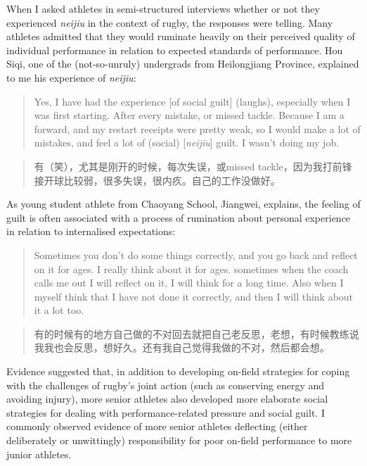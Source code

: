 \begin{CJK}{UTF8}{gbsn}
When I asked athletes in semi-structured interviews whether or not they experienced \textit{neijiu} in the context of rugby, the responses were telling.  Many athletes admitted that they would ruminate heavily on their perceived quality of individual performance in relation to expected standards of performance.  Hou Siqi, one of the (not-so-unruly) undergrads from Heilongjiang Province, explained to me his experience of \textit{neijiu}:

      \begin{quote}
        Yes, I have had the experience [of social guilt] (laughs), especially when I was first starting. After every mistake, or missed tackle.  Because I am a forward, and my restart receipts were pretty weak, so I would make a lot of mistakes, and feel a lot of (social) [\textit{neijiu}] guilt.  I wasn't doing my job.
      \end{quote}

      \begin{quote}
        有（笑），尤其是刚开的时候，每次失误，或missed tackle，因为我打前锋 接开球比较弱，很多失误，很内疚。自己的工作没做好。
      \end{quote}

As young student athlete from Chaoyang School, Jiangwei, explains, the feeling of guilt is often associated with a process of rumination about personal experience in relation to internalised expectations:

      \begin{quote}
        Sometimes you don't do some things correctly, and you go back and reflect on it for ages. I really think about it for ages. sometimes when the coach calls me out I will reflect on it, I will think for a long time. Also when I myself think that I have not done it correctly, and then I will think about it a lot too.
      \end{quote}

      \begin{quote}
        有的时候有的地方自己做的不对回去就把自己老反思，老想，有时候教练说我我也会反思，想好久。还有我自己觉得我做的不对，然后都会想。
      \end{quote}



Evidence suggested that, in addition to developing on-field strategies for coping with the challenges of rugby’s joint action (such as conserving energy and avoiding injury), more senior athletes also developed more elaborate social strategies for dealing with performance-related pressure and social guilt.  I commonly observed evidence of more senior athletes deflecting (either deliberately or unwittingly) responsibility for poor on-field performance to more junior athletes.


\end{CJK}
